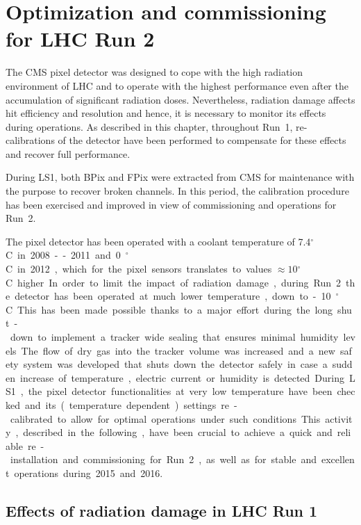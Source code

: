 \chapter{Optimization and commissioning for LHC Run 2}\label{ch:BPixCalib}

The CMS pixel detector was designed to cope with the high radiation environment of LHC and to operate with the highest performance even after the accumulation of significant radiation doses.
Nevertheless, radiation damage affects hit efficiency and resolution and hence, it is necessary to monitor its effects during operations.
As described in this chapter, throughout Run~1, re-calibrations of the detector have been performed to compensate for these effects and recover full performance.

During LS1, both BPix and FPix were extracted from CMS for maintenance with the purpose to recover broken channels.
In this period, the calibration procedure has been exercised and improved in view of commissioning and operations for Run~2.

The pixel detector has been operated with a coolant temperature of 7.4\unit{$^\circ$C} in 2008--2011 and 0\unit{$^\circ$C} in 2012, which for the pixel sensors translates to values $\approx10$\unit{$^\circ$C} higher.
In order to limit the impact of radiation damage, during Run~2 the detector has been operated at much lower temperature, down to -10\unit{$^\circ$C}.
This has been made possible thanks to a major effort during the long shut-down to implement a tracker wide sealing that ensures minimal humidity levels.
The flow of dry gas into the tracker volume was increased and a new safety system was developed that shuts down the detector safely in case a sudden increase of temperature, electric current or humidity is detected. 
During LS1, the pixel detector functionalities at very low temperature have been checked and its (temperature dependent) settings re-calibrated to allow for optimal operations under such conditions.
This activity, described in the following, have been crucial to achieve a quick and reliable re-installation and commissioning for Run~2, as well as for stable and excellent operations during 2015 and 2016.

\section{Effects of radiation damage in LHC Run 1}

